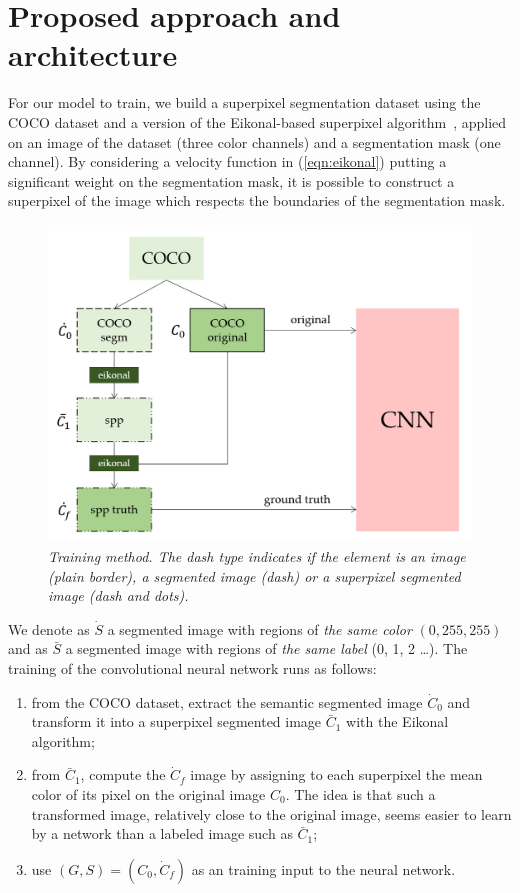 \documentclass{article}
\begin{document}
\section{Proposed approach and architecture}
    For our model to train, we build a superpixel segmentation dataset using the COCO dataset and a version of the Eikonal-based superpixel algorithm~\cite{figliuzzi2019}, applied on an image of the dataset (three color channels) and a segmentation mask (one channel). By considering a velocity function in (\ref{eqn:eikonal}) putting a significant weight on the segmentation mask, it is possible to construct a superpixel of the image which respects the boundaries of the segmentation mask.
    \begin{figure}[!ht]
        \centering
        \includegraphics[width=.7\linewidth]{pics/schema-train.png}
        \caption{\textit{Training method. The dash type indicates if the element is an image (plain border), a segmented image (dash) or a superpixel segmented image (dash and dots).}}
    \end{figure}
    \par
    We denote as $\dot S$ a segmented image with regions of \textit{the same color} $(0, 255, 255)$  and as $\bar S$ a segmented image with regions of \textit{the same label} (0, 1, 2 \dots). The training of the convolutional neural network runs as follows:
    \begin{enumerate}
        \item from the COCO dataset, extract the semantic segmented image $\dot C_0$ and transform it into a superpixel segmented image $\bar C_1$ with the Eikonal algorithm;
        \item from $\bar C_1$, compute the $\dot C_f$ image by assigning to each superpixel the mean color of its pixel on the original image $C_0$. The idea is that such a transformed image, relatively close to the original image, seems easier to learn by a network than a labeled image such as $\bar C_1$;
        \item use $(G,S)=(C_0, \dot C_f)$ as an training input to the neural network.
    \end{enumerate}
\end{document}
